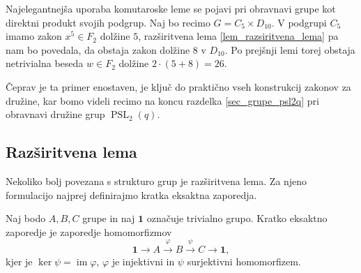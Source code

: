 \documentclass[mat1, tisk]{fmfdelo}
\numberwithin{equation}{section}  %
\begin{document}

\begin{primer}
Najelegantnejša uporaba komutaroske leme se pojavi pri obravnavi grupe kot direktni produkt svojih podgrup. Naj bo recimo $G = C_5 \times D_{10}$. 
V podgrupi $C_5$ imamo zakon $x^{5} \in F_2$ dolžine $5$, razširitvena lema \ref{lem_razsiritvena_lema} pa nam bo povedala, da obstaja zakon dolžine $8$ v $D_{10}$. Po prejšnji lemi torej obstaja
netrivialna beseda $w \in F_2$ dolžine $2 \cdot (5 + 8) = 26$.
\end{primer}

Čeprav je ta primer enostaven, je ključ do praktično vseh konstrukcij zakonov za družine, kar bomo videli recimo na koncu razdelka \ref{sec_grupe_psl2q} pri obravnavi družine grup $\operatorname{PSL}_2(q)$. 

  


\subsection{Razširitvena lema}

Nekoliko bolj povezana s strukturo grup je razširitvena lema. Za njeno formulacijo najprej definirajmo kratka eksaktna zaporedja.
\begin{definicija}
\label{def_kratko_eksaktno_zaporedje}
Naj bodo $A, B, C$ grupe in naj $\mathbf{1}$ označuje trivialno grupo. Kratko eksaktno zaporedje je zaporedje homomorfizmov
\begin{equation*}
\mathbf{1} \to A \xrightarrow{\varphi} B \xrightarrow{\psi} C \to \mathbf{1},
\end{equation*}  
kjer je $\ker \psi = \operatorname{im} \varphi$, $\varphi$ je injektivni in $\psi$ surjektivni homomorfizem.
\end{definicija}
\end{document}
